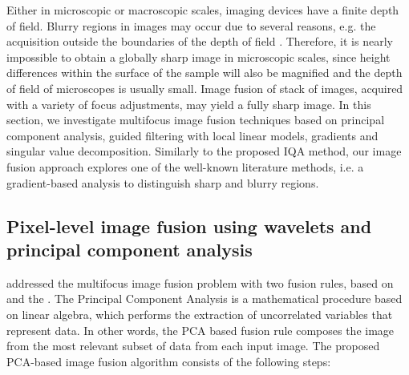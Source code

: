 Either in microscopic or macroscopic scales, imaging devices have a finite depth of field. Blurry regions in images may occur due to several reasons, e.g. the acquisition outside the boundaries of the depth of field \cite{huang2007evaluation}. Therefore, it is nearly impossible to obtain a globally sharp image in microscopic scales, since height differences within the surface of the sample will also be magnified and the depth of field of microscopes is usually small. Image fusion of stack of images, acquired with a variety of focus adjustments, may yield a fully sharp image. In this section, we investigate multifocus image fusion techniques based on principal component analysis, guided filtering with local linear models, gradients and singular value decomposition. Similarly to the proposed IQA method, our image fusion approach explores one of the well-known literature methods, i.e. a gradient-based analysis to distinguish sharp and blurry regions.

\subsection{Pixel-level image fusion using wavelets and principal component analysis}

 addressed the multifocus image fusion problem with two fusion rules, based on  and the . The Principal Component Analysis is a mathematical procedure based on linear algebra, which performs the extraction of uncorrelated variables that represent data. In other words, the PCA based fusion rule composes the image from the most relevant subset of data from each input image. The proposed PCA-based image fusion algorithm consists of the following steps:

